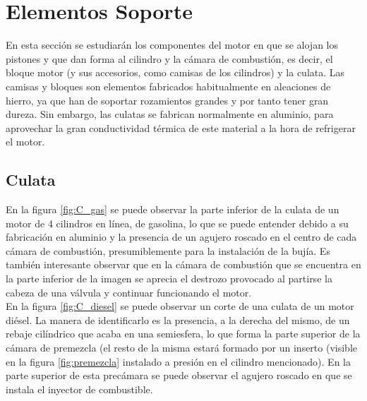 \newpage

\section{Elementos Soporte} \label{s:section_03}

En esta sección se estudiarán los componentes del motor en que se alojan los pistones y que dan forma al cilindro y la cámara de combustión, es decir, el bloque motor (y sus accesorios, como camisas de los cilindros) y la culata. Las camisas y bloques son elementos fabricados habitualmente en aleaciones de hierro, ya que han de soportar rozamientos grandes y por tanto tener gran dureza. Sin embargo, las culatas se fabrican normalmente en aluminio, para aprovechar la gran conductividad térmica de este material a la hora de refrigerar el motor.\\


\subsection{Culata} \label{ss:culata}

En la figura \ref{fig:C_gas} se puede observar la parte inferior de la culata de un motor de 4 cilindros en línea, de gasolina, lo que se puede entender debido a su fabricación en aluminio y la presencia de un agujero roscado en el centro de cada cámara de combustión, presumiblemente para la instalación de la bujía. Es también interesante observar que en la cámara de combustión que se encuentra en la parte inferior de la imagen se aprecia el destrozo provocado al partirse la cabeza de una válvula y continuar funcionando el motor.\\ 

En la figura \ref{fig:C_diesel} se puede observar un corte de una culata de un motor diésel. La manera de identificarlo es la presencia, a la derecha del mismo, de un rebaje cilíndrico que acaba en una semiesfera, lo que forma la parte superior de la cámara de premezcla (el resto de la misma estará formado por un inserto (visible en la figura \ref{fig:premezcla} instalado a presión en el cilindro mencionado). En la parte superior de esta precámara se puede observar el agujero roscado en que se instala el inyector de combustible.

